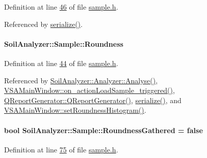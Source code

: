 Definition at line \hyperlink{sample_8h_source_l00046}{46} of file \hyperlink{sample_8h_source}{sample.\+h}.



Referenced by \hyperlink{sample_8h_source_l00085}{serialize()}.

\hypertarget{class_soil_analyzer_1_1_sample_a36b7e98ebd5d162fa0cda77fa4c7f0be}{}
\paragraph[{Roundness}]{ Soil\+Analyzer\+::\+Sample\+::\+Roundness}\label{class_soil_analyzer_1_1_sample_a36b7e98ebd5d162fa0cda77fa4c7f0be}


Definition at line \hyperlink{sample_8h_source_l00044}{44} of file \hyperlink{sample_8h_source}{sample.\+h}.



Referenced by \hyperlink{analyzer_8cpp_source_l00065}{Soil\+Analyzer\+::\+Analyzer\+::\+Analyse()}, \hyperlink{vsamainwindow_8cpp_source_l00475}{V\+S\+A\+Main\+Window\+::on\+\_\+action\+Load\+Sample\+\_\+triggered()}, \hyperlink{qreportgenerator_8cpp_source_l00004}{Q\+Report\+Generator\+::\+Q\+Report\+Generator()}, \hyperlink{sample_8h_source_l00085}{serialize()}, and \hyperlink{vsamainwindow_8cpp_source_l00291}{V\+S\+A\+Main\+Window\+::set\+Roundness\+Histogram()}.

\hypertarget{class_soil_analyzer_1_1_sample_ae2fc7565d25978ea639e4f273d7b9bd4}{}
\paragraph[{Roundness\+Gathered}]{\setlength{\rightskip}{0pt plus 5cm}bool Soil\+Analyzer\+::\+Sample\+::\+Roundness\+Gathered = false\hspace{0.3cm}{\ttfamily [private]}}\label{class_soil_analyzer_1_1_sample_ae2fc7565d25978ea639e4f273d7b9bd4}


Definition at line \hyperlink{sample_8h_source_l00075}{75} of file \hyperlink{sample_8h_source}{sample.\+h}.



